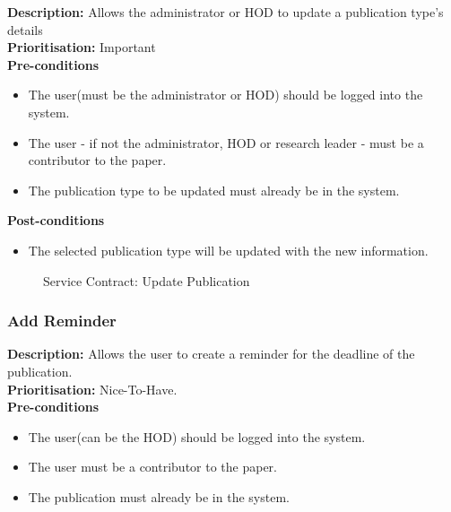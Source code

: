 \documentclass[a4paper]{article}
\begin{document}
        \textbf{Description:} Allows the administrator or HOD to update a publication type's details\\
        \textbf{Prioritisation:} Important\\
        
        
        \textbf{Pre-conditions}
         \begin{itemize}
            \item The user(must be the administrator or HOD) should be logged into the system.
            \item The user - if not the administrator, HOD or research leader - must be a contributor to the paper.
            \item The publication type to be updated must already be in the system.
       \end{itemize}
        
        \textbf{Post-conditions}
        \begin{itemize}
            \item The selected publication type will be updated with the new information.
        \end{itemize}
        
                \begin{figure}[H]
                	\centering
                	\caption{Service Contract: Update Publication}
                \end{figure}
        
        \pagebreak
    \subsubsection{Add Reminder}
            \textbf{Description:} Allows the user to create a reminder for the deadline of the publication.\\
            \textbf{Prioritisation:} Nice-To-Have.
            \\
            
            \textbf{Pre-conditions}
            \begin{itemize}
            	\item The user(can be the HOD) should be logged into the system.
            	\item The user must be a contributor to the paper.
            	\item The publication must already be in the system.
            \end{itemize}
            
\end{document}
